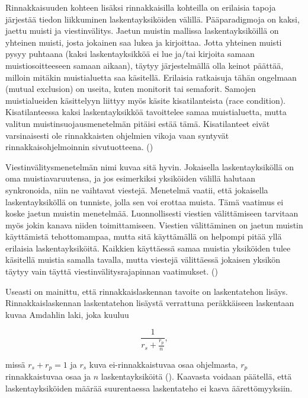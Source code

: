 Rinnakkaisuuden kohteen lisäksi rinnakkaisilla kohteilla on erilaisia tapoja
järjestää tiedon liikkuminen laskentayksiköiden välillä. Pääparadigmoja on
kaksi, jaettu muisti ja viestinvälitys. Jaetun muistin mallissa
laskentayksiköillä on yhteinen muisti, josta jokainen saa lukea ja kirjoittaa.
Jotta yhteinen muisti pysyy puhtaana (kaksi laskentayksikköä ei lue ja/tai
kirjoita samaan muistiosoitteeseen samaan aikaan), täytyy järjestelmällä
olla keinot päättää, milloin mitäkin muistialuetta saa käsitellä.
Erilaisia ratkaisuja tähän ongelmaan (mutual exclusion) on useita, kuten
monitorit tai semaforit. Samojen muistialueiden käsittelyyn
liittyy myös käsite kisatilanteista (race condition). Kisatilanteessa kaksi
laskentayksikköä tavoittelee samaa muistialuetta, mutta valitun
muistinsuojausmenetelmän pitäisi estää tämä. Kisatilanteet eivät varsinaisesti
ole rinnakkaisten ohjelmien vikoja vaan syntyvät rinnakkaisohjelmoinnin
sivutuotteena. (\cite{ari})

Viestinvälitysmenetelmän nimi kuvaa sitä hyvin. Jokaisella
laskentayksiköllä on oma muistiavaruutensa, ja jos esimerkiksi  yksiköiden
välillä halutaan synkronoida, niin ne vaihtavat viestejä. Menetelmä vaatii,
että jokaisella laskentayksiköllä on tunniste, jolla sen voi erottaa muista.
Tämä vaatimus ei koske jaetun muistin menetelmää. Luonnollisesti viestien
välittämiseen tarvitaan myös jokin kanava niiden toimittamiseen. Viestien
välittäminen on jaetun muistin käyttämistä tehottomampaa, mutta sitä
käyttämällä on helpompi pitää yllä erilaisia laskentayksiköitä. Kaikkien
käyttäessä samaa muistia yksiköiden tulee käsitellä muistia samalla tavalla,
mutta viestejä välittäessä jokaisen yksikön täytyy vain täyttä
viestinvälitysrajapinnan vaatimukset. (\cite{intro})

Useasti on mainittu, että rinnakkaislaskennan tavoite on laskentatehon
lisäys. Rinnakkaislaskennan laskentatehon lisäystä verrattuna peräkkäiseen
laskentaan kuvaa Amdahlin laki, joka kuuluu

\begin{center}
\begin{equation}\frac{1}{r_s + \frac{r_p}{n}},\end{equation}
\end{center}

missä $r_s + r_p = 1$ ja $r_s$ kuva ei-rinnakkaistuvaa osaa ohjelmasta,
$r_p$ rinnakkaistuvaa osaa ja $n$ laskentayksiköitä (\cite{amdahl}).
Kaavasta voidaan päätellä, että laskentayksiköiden määrää suurentaessa
laskentateho ei kasva äärettömyyksiin.

